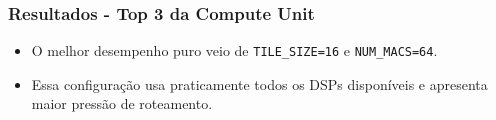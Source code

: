 \documentclass{beamer}
\begin{document}
\begin{frame}
\frametitle{Resultados - Top 3 da Compute Unit}

\begin{table}
\centering
\tiny
\caption{Melhores configurações do sweep \texttt{compute\_unit\_only}, ordenadas por \(GOPS_{eff}\) aproximado.}
\end{table}

\vspace{0.1cm}
\begin{itemize}
    \item O melhor desempenho puro veio de \texttt{TILE\_SIZE=16} e \texttt{NUM\_MACS=64}.
    \item Essa configuração usa praticamente todos os DSPs disponíveis e apresenta maior pressão de roteamento.
\end{itemize}

\end{frame}
\end{document}
